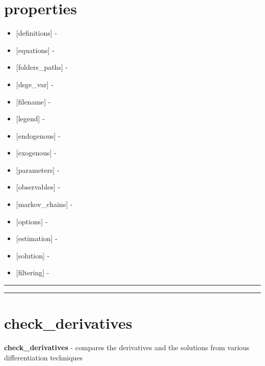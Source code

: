 \documentclass[letterpaper,10pt,english]{sphinxmanual}
\begin{document}
\section{properties}
\label{classes/models/@dsge/dsge:properties}\begin{itemize}
\item {} 
{[}definitions{]} -

\item {} 
{[}equations{]} -

\item {} 
{[}folders\_paths{]} -

\item {} 
{[}dsge\_var{]} -

\item {} 
{[}filename{]} -

\item {} 
{[}legend{]} -

\item {} 
{[}endogenous{]} -

\item {} 
{[}exogenous{]} -

\item {} 
{[}parameters{]} -

\item {} 
{[}observables{]} -

\item {} 
{[}markov\_chains{]} -

\item {} 
{[}options{]} -

\item {} 
{[}estimation{]} -

\item {} 
{[}solution{]} -

\item {} 
{[}filtering{]} -

\end{itemize}


\bigskip\hrule{}\bigskip



\bigskip\hrule{}\bigskip



\section{check\_derivatives}
\label{classes/models/@dsge/dsge:check-derivatives}\label{classes/models/@dsge/dsge:id1}
\textbf{check\_derivatives} - compares the derivatives and the solutions from various differentiation techniques
\end{document}
